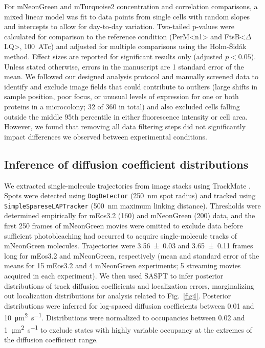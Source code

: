 \documentclass[twocolumn,pdflatex,sn-nature]{sn-jnl}%
\def\textsuperscript#1{<#1>}%
\newcommand\ftsbdLQ{FtsB\textsuperscript{$\Delta{}$LQ}}
\newcommand\permN{PerM\textsuperscript{n1}}
\begin{document}
For mNeonGreen and mTurquoise2 concentration and correlation comparisons, a mixed linear model was fit to data points from single cells with random slopes and intercepts to allow for day-to-day variation.
Two-tailed p-values were calculated for comparison to the reference condition (\permN{} and \ftsbdLQ{}, \qty{100}{\nM}~ATc) and adjusted for multiple comparisons using the Holm-Šidák method.
Effect sizes are reported for significant results only (adjusted $p<0.05$).
Unless stated otherwise, errors in the manuscript are 1 standard error of the mean.
We followed our designed analysis protocol and manually screened data to identify and exclude image fields that could contribute to outliers (large shifts in sample position, poor focus, or unusual levels of expression for one or both proteins in a microcolony; 32 of 360 in total) and also excluded cells falling outside the middle 95th percentile in either fluorescence intensity or cell area.
However, we found that removing all data filtering steps did not significantly impact differences we observed between experimental conditions.

\subsection{Inference of diffusion coefficient distributions}

We extracted single-molecule trajectories from image stacks using TrackMate \citep{tinevezTrackMateOpenExtensible2017}. Spots were detected using \verb|DogDetector| (\qty{250}{\nm} spot radius) and tracked using \verb|SimpleSpareseLAPTracker| (\qty{500}{\nm} maximum linking distance).
Thresholds were determined empirically for mEos3.2 (160) and mNeonGreen (200) data, and the first 250 frames of mNeonGreen movies were omitted to exclude data before sufficient photobleaching had occurred to acquire single-molecule tracks of mNeonGreen molecules.
Trajectories were \num{3.56 +- 0.03} and \num{3.65 +- 0.11} frames long for mEos3.2 and mNeonGreen, respectively (mean and standard error of the means for 15 mEos3.2 and 4 mNeonGreen experiments; 5 streaming movies acquired in each experiment).
We then used SASPT \citep{heckertRecoveringMixturesFastdiffusing2022a} to infer posterior distributions of track diffusion coefficients and localization errors, marginalizing out localization distributions for analysis related to Fig.~\ref{fig4}.
Posterior distributions were inferred for log-spaced diffusion coefficients between \num{0.01} and \qty{10}{\square\um\per\s}.
Distributions were normalized to occupancies between \num{0.02} and \qty{1}{\square\um\per\s} to exclude states with highly variable occupancy at the extremes of the diffusion coefficient range.
\end{document}
